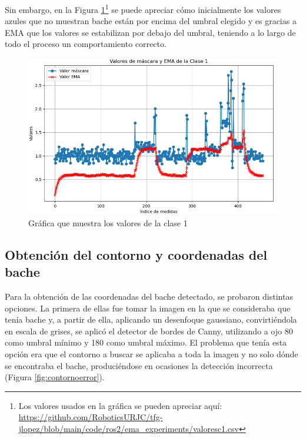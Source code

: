 Sin embargo, en la Figura \ref{fig:diagramaemac1}\footnote{Los valores usados en la gráfica se pueden apreciar aquí: \url{https://github.com/RoboticsURJC/tfg-jlopez/blob/main/code/ros2/ema_experiments/valoresc1.csv}} se puede apreciar cómo inicialmente los valores azules que no muestran bache están por encima del umbral elegido y es gracias a EMA que los valores se estabilizan por debajo del umbral, teniendo a lo largo de todo el proceso un comportamiento correcto. 

\begin{figure} [h!]
	\begin{center}
		\includegraphics[width=11.5cm]{figs/cap7/GraficaC1.png}
	\end{center}
	\caption{Gráfica que muestra los valores de la clase 1}
	\label{fig:diagramaemac1}
\end{figure}

\subsection{Obtención del contorno y coordenadas del bache}
\label{subsec:expcontorno}

Para la obtención de las coordenadas del bache detectado, se probaron distintas opciones. La primera de ellas fue tomar la imagen en la que se consideraba que tenía bache y, a partir de ella, aplicando un desenfoque gaussiano, convirtiéndola en escala de grises, se aplicó el detector de bordes de Canny, utilizando a ojo 80 como umbral mínimo y 180 como umbral máximo. El problema que tenía esta opción era que el contorno a buscar se aplicaba a toda la imagen y no solo dónde se encontraba el bache, produciéndose en ocasiones la detección incorrecta (Figura \ref{fig:contornoerror}).

